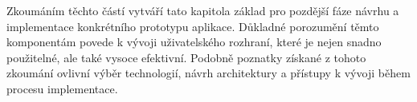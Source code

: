 Zkoumáním těchto částí vytváří tato kapitola základ pro pozdější fáze návrhu a implementace konkrétního prototypu aplikace.
Důkladné porozumění těmto komponentám povede k vývoji uživatelského rozhraní, které je nejen snadno použitelné, ale také vysoce efektivní.
Podobně poznatky získané z tohoto zkoumání ovlivní výběr technologií, návrh architektury a přístupy k vývoji během procesu implementace.
